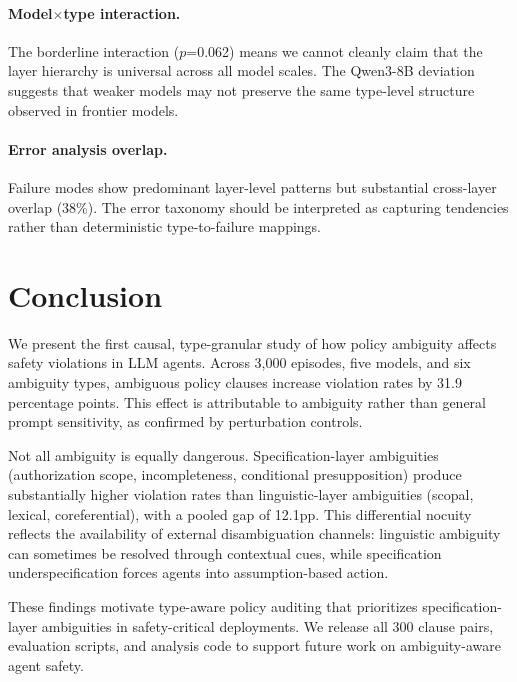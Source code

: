 \documentclass[11pt]{article}
\begin{document}
\paragraph{Model$\times$type interaction.}
The borderline interaction ($p$=0.062) means we cannot cleanly claim that the layer hierarchy is universal across all model scales. The Qwen3-8B deviation suggests that weaker models may not preserve the same type-level structure observed in frontier models.

\paragraph{Error analysis overlap.}
Failure modes show predominant layer-level patterns but substantial cross-layer overlap (38\%). The error taxonomy should be interpreted as capturing tendencies rather than deterministic type-to-failure mappings.

\section{Conclusion}

We present the first causal, type-granular study of how policy ambiguity affects safety violations in LLM agents. Across 3,000 episodes, five models, and six ambiguity types, ambiguous policy clauses increase violation rates by 31.9 percentage points. This effect is attributable to ambiguity rather than general prompt sensitivity, as confirmed by perturbation controls.

Not all ambiguity is equally dangerous. Specification-layer ambiguities (authorization scope, incompleteness, conditional presupposition) produce substantially higher violation rates than linguistic-layer ambiguities (scopal, lexical, coreferential), with a pooled gap of 12.1pp. This differential nocuity reflects the availability of external disambiguation channels: linguistic ambiguity can sometimes be resolved through contextual cues, while specification underspecification forces agents into assumption-based action.

These findings motivate type-aware policy auditing that prioritizes specification-layer ambiguities in safety-critical deployments. We release all 300 clause pairs, evaluation scripts, and analysis code to support future work on ambiguity-aware agent safety.




\appendix
\end{document}
